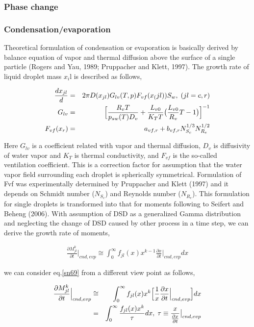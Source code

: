 \subsubsection{Phase change}
\subsubsection{Condensation/evaporation}
Theoretical formulation of condensation or evaporation is basically derived by balance equation of vapor and thermal diffusion above the surface of a single particle (Rogers and Yau, 1989; Pruppacher and Klett, 1997). The growth rate of liquid droplet mass $x_{i}$l is described as follows,

\begin{eqnarray}
\frac{dx_{jl}}{d}&=&2\pi D(x_{jl})G_{lv}(T,p)F_{vf}(x_(jl))S_{w},\; (jl=c,r)\label{sn66}\\
G_{lv}&=&\Bigl[\frac{R_{v}T}{p_{sw}(T)D_{v}}+\frac{L_{v0}}{K_{T}T}\bigl(\frac{L_{v0}}{R_{v}}{T}-1\bigr)\Bigr]^{-1}\label{sn67}\\
F_{vf}(x_{r})&=&a_{vf,r}+b_{vf,r}N_{S_{c}}^{1/3}N_{R_{e}}^{1/2}\label{sn68}
\end{eqnarray}

Here $G_{lv}$ is a coefficient related with vapor and thermal diffusion, $D_{v}$ is diffusivity of water vapor and $K_{T}$ is thermal conductivity, and $F_{vf}$ is the so-called ventilation coefficient. This is a correction factor for assumption that the water vapor field surrounding each droplet is spherically symmetrical. Formulation of Fvf was experimentally determined by Pruppacher and Klett (1997) and it depends on Schmidt number ($N_{S_{c}}$) and Reynolds number ($N_{R_{e}}$). This formulation for single droplets is transformed into that for moments following to Seifert and Beheng (2006). With assumption of DSD as a generalized Gamma distribution and neglecting the change of DSD caused by other process in a time step, we can derive the growth rate of moments,

\begin{eqnarray}
\frac{\partial M_{jl}^{k}}{\partial t}\Bigr|_{cnd,evp}\cong \int_{0}^{\infty}f_{jl}(x)x^{k-1}\frac{\partial x}{\partial t}\Bigr|_{cnd,evp}dx\label{sn69}
\end{eqnarray}

we can consider eq.\ref{sn69} from a different view point as follows,

\begin{eqnarray}
\frac{\partial M_{jl}^{k}}{\partial t}\Bigr|_{cnd,evp}&\cong& \int_{0}^{\infty}f_{jl}(x)x^{k}\Bigl[\frac{1}{x}\frac{\partial x}{\partial t}\Bigr|_{cnd,evp}\Bigr]dx\nonumber\\
&=&\int_{0}^{\infty}\frac{f_{jl}(x)x^{k}}{\tau}dx,\;\tau\equiv\frac{x}{\frac{\partial x}{\partial t}}\bigr|_{cnd,evp}\label{sn70}
\end{eqnarray}

